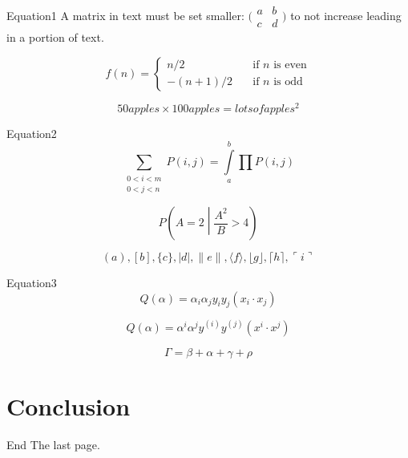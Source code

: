 \begin{frame}{Equation1}
    A matrix in text must be set  smaller:
    $\bigl(\begin{smallmatrix}
    a&b \\ c&d
    \end{smallmatrix} \bigr)$
    to not increase leading in a portion of text.

    \[ f(n) =
    \begin{cases}
        n/2       & \quad \text{if } n \text{ is even}\\
        -(n+1)/2  & \quad \text{if } n \text{ is odd}
    \end{cases}
    \]

    $$50 apples \times 100 apples = lots of apples^2$$
\end{frame}

\begin{frame}{Equation2}
    $$\sum_{\substack{0<i<m \\ 0<j<n }} 
      P(i,j)=\int\limits_a^b\prod P(i,j)$$

    $$P\left(A=2\middle|\frac{A^2}{B}>4\right)$$

    $$( a ), [ b ], \{ c \}, | d |, \| e \|,
    \langle f \rangle, \lfloor g \rfloor,
    \lceil h \rceil, \ulcorner i \urcorner$$
\end{frame}

\begin{frame}{Equation3}
    $$Q(\alpha)=\alpha_i\alpha_jy_iy_j(x_i\cdot x_j)$$

    $$Q(\alpha)=\alpha^i\alpha^jy^{(i)}y^{(j)}(x^i\cdot x^j)$$
    
    $$\Gamma=\beta+\alpha+\gamma+\rho$$
\end{frame}



\section{Conclusion}

\begin{frame}{End}
    The last page.
\end{frame}